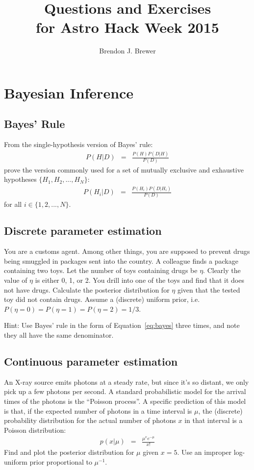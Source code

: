 \documentclass[a4paper, 11pt]{article}
\title{Questions and Exercises\\
for Astro Hack Week 2015}
\author{Brendon J. Brewer}
\begin{document}
\maketitle

\section{Bayesian Inference}


\subsection{Bayes' Rule}
From the single-hypothesis version of Bayes' rule:
\begin{eqnarray}
P(H|D) &=& \frac{P(H)P(D|H)}{P(D)}
\end{eqnarray}
prove the version commonly used for a set of mutually exclusive and exhaustive
hypotheses $\{H_1, H_2, ..., H_N\}$:
\begin{eqnarray}
P(H_i|D) &=& \frac{P(H_i)P(D|H_i)}{P(D)}\label{eq:bayes}
\end{eqnarray}
for all $i \in \{1, 2, ..., N\}$.

\subsection{Discrete parameter estimation}
You are a customs agent. Among other things, you are supposed to prevent
drugs being smuggled in packages sent into the country. A colleague finds a
package containing two toys. Let the number of toys containing drugs be
$\eta$. Clearly the value of $\eta$ is either 0, 1, or 2. You drill into
one of the toys and find that it does not have drugs.
Calculate the posterior distribution for $\eta$ given that the tested
toy did not contain drugs. Assume a (discrete) uniform prior, i.e.
$P(\eta=0) = P(\eta=1) = P(\eta=2) = 1/3$.

{\tiny Hint: Use Bayes' rule in the form of Equation~\ref{eq:bayes}
three times, and note they all have the same denominator.}

\subsection{Continuous parameter estimation}
An X-ray source emits photons at a steady rate, but since it's so distant, we
only pick up a few photons per second.
A standard probabilistic model for the arrival times of the photons is the
``Poisson process''. A specific prediction of this model is that, if the
expected number of photons in a time interval
is $\mu$, the (discrete) probability distribution for the actual number of photons $x$ in that interval is a Poisson distribution:
\begin{eqnarray}
p(x | \mu) &=& \frac{\mu^x e^{-\mu}}{x!}
\end{eqnarray}
Find and plot the posterior distribution for $\mu$ given $x=5$. Use an improper
log-uniform prior proportional to $\mu^{-1}$.
\end{document}
